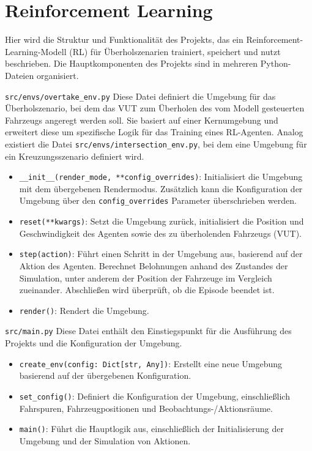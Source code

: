 \section{Reinforcement Learning}
Hier wird die Struktur und Funktionalität des Projekts, das ein Reinforcement-Learning-Modell (RL) für Überholszenarien trainiert, speichert und nutzt beschrieben. Die Hauptkomponenten des Projekts sind in mehreren Python-Dateien organisiert.

\texttt{src/envs/overtake\_env.py}
Diese Datei definiert die Umgebung für das Überholszenario, bei dem das VUT zum Überholen des vom Modell gesteuerten Fahrzeugs angeregt werden soll. Sie basiert auf einer Kernumgebung und erweitert diese um spezifische Logik für das Training eines RL-Agenten.
Analog existiert die Datei \texttt{src/envs/intersection\_env.py}, bei dem eine Umgebung für ein Kreuzungsszenario definiert wird.

\begin{itemize}
    \item \texttt{\_\_init\_\_(render\_mode, **config\_overrides)}: Initialisiert die Umgebung mit dem übergebenen Rendermodus. Zusätzlich kann die Konfiguration der Umgebung über den \texttt{config\_overrides} Parameter überschrieben werden.
    \item \texttt{reset(**kwargs)}: Setzt die Umgebung zurück, initialisiert die Position und Geschwindigkeit des Agenten sowie des zu überholenden Fahrzeugs (VUT).
    \item \texttt{step(action)}: Führt einen Schritt in der Umgebung aus, basierend auf der Aktion des Agenten. Berechnet Belohnungen anhand des Zustandes der Simulation, unter anderem der Position der Fahrzeuge im Vergleich zueinander. Abschließen wird überprüft, ob die Episode beendet ist. 
    \item \texttt{render()}: Rendert die Umgebung.
\end{itemize}

\texttt{src/main.py}
Diese Datei enthält den Einstiegspunkt für die Ausführung des Projekts und die Konfiguration der Umgebung.

\begin{itemize}
    \item \texttt{create\_env(config: Dict[str, Any])}: Erstellt eine neue Umgebung basierend auf der übergebenen Konfiguration.
    \item \texttt{set\_config()}: Definiert die Konfiguration der Umgebung, einschließlich Fahrspuren, Fahrzeugpositionen und Beobachtungs-/Aktionsräume.
    \item \texttt{main()}: Führt die Hauptlogik aus, einschließlich der Initialisierung der Umgebung und der Simulation von Aktionen.
\end{itemize}

